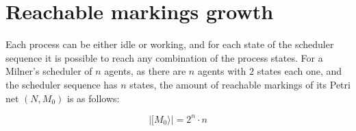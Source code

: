 \documentclass{article}
\begin{document}
\section{Reachable markings growth}

Each process can be either idle or working, and for each state of the 
scheduler sequence it is possible to reach any combination of the 
process states. For a Milner's scheduler of $n$ agents, as there are 
$n$ agents with $2$ states each one, and the scheduler sequence has $n$ 
states, the amount of reachable markings of its Petri net $(N, M_0)$ is 
as follows:

$$\big|[M_0\rangle\big| = 2^n \cdot n$$
\end{document}
